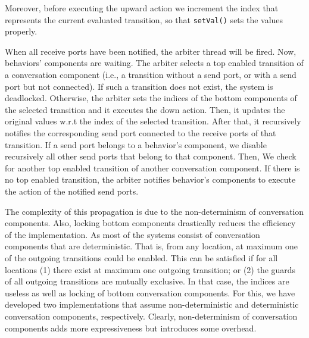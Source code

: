 Moreover, before executing the upward action we increment the index that represents the current evaluated transition, so that \texttt{setVal()} sets the values properly. 


When all receive ports have been notified, the arbiter thread will be fired. Now, behaviors' components are waiting.  The arbiter selects a top enabled transition of a conversation component (i.e., a transition without a send port, or with a send port but not connected). If such a transition does not exist, the system is deadlocked. Otherwise, the arbiter sets the indices of the bottom components of the selected transition and it executes the down action. Then, it updates the original values w.r.t the index of the selected transition. After that, it recursively notifies the corresponding send port connected to the receive ports of that transition. If a send port belongs to a behavior's component, we disable recursively all other send ports that belong to that component. Then, We check for another top enabled transition of another conversation component. If there is no top enabled transition, the arbiter notifies behavior's components to execute the action of the notified send ports. 


The complexity of this propagation is due to the non-determinism of conversation components. Also, locking bottom components drastically reduces the efficiency of the implementation. As most of the systems consist of conversation components that are deterministic. That is, from any location, at maximum one of the outgoing transitions could be enabled. This can be satisfied if for all locations (1) there exist at maximum one outgoing transition; or (2) the guards of all outgoing transitions are mutually exclusive. In that case, the indices are useless as well as locking of bottom conversation components.
For this, we have developed two implementations that assume non-deterministic and deterministic conversation components, respectively. Clearly, non-determinism of conversation components adds more expressiveness but introduces some overhead. 




